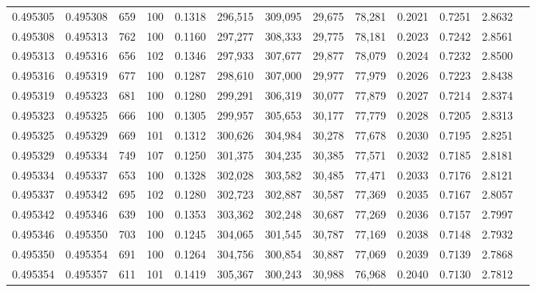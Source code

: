 \begin{tabular}{rrrrrrrrrrrrr}
0.495305 & 0.495308 &   659 & 100 &                                     0.1318 & 296,515 & 309,095 &  29,675 &  78,281 & 0.2021 & 0.7251 & 2.8632 \\
0.495308 & 0.495313 &   762 & 100 &                                     0.1160 & 297,277 & 308,333 &  29,775 &  78,181 & 0.2023 & 0.7242 & 2.8561 \\
0.495313 & 0.495316 &   656 & 102 &                                     0.1346 & 297,933 & 307,677 &  29,877 &  78,079 & 0.2024 & 0.7232 & 2.8500 \\
0.495316 & 0.495319 &   677 & 100 &                                     0.1287 & 298,610 & 307,000 &  29,977 &  77,979 & 0.2026 & 0.7223 & 2.8438 \\
0.495319 & 0.495323 &   681 & 100 &                                     0.1280 & 299,291 & 306,319 &  30,077 &  77,879 & 0.2027 & 0.7214 & 2.8374 \\
0.495323 & 0.495325 &   666 & 100 &                                     0.1305 & 299,957 & 305,653 &  30,177 &  77,779 & 0.2028 & 0.7205 & 2.8313 \\
0.495325 & 0.495329 &   669 & 101 &                                     0.1312 & 300,626 & 304,984 &  30,278 &  77,678 & 0.2030 & 0.7195 & 2.8251 \\
0.495329 & 0.495334 &   749 & 107 &                                     0.1250 & 301,375 & 304,235 &  30,385 &  77,571 & 0.2032 & 0.7185 & 2.8181 \\
0.495334 & 0.495337 &   653 & 100 &                                     0.1328 & 302,028 & 303,582 &  30,485 &  77,471 & 0.2033 & 0.7176 & 2.8121 \\
0.495337 & 0.495342 &   695 & 102 &                                     0.1280 & 302,723 & 302,887 &  30,587 &  77,369 & 0.2035 & 0.7167 & 2.8057 \\
0.495342 & 0.495346 &   639 & 100 &                                     0.1353 & 303,362 & 302,248 &  30,687 &  77,269 & 0.2036 & 0.7157 & 2.7997 \\
0.495346 & 0.495350 &   703 & 100 &                                     0.1245 & 304,065 & 301,545 &  30,787 &  77,169 & 0.2038 & 0.7148 & 2.7932 \\
0.495350 & 0.495354 &   691 & 100 &                                     0.1264 & 304,756 & 300,854 &  30,887 &  77,069 & 0.2039 & 0.7139 & 2.7868 \\
0.495354 & 0.495357 &   611 & 101 &                                     0.1419 & 305,367 & 300,243 &  30,988 &  76,968 & 0.2040 & 0.7130 & 2.7812 \\

\end{tabular}
